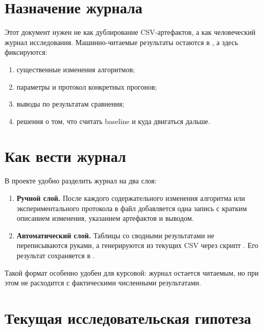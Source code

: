 \documentclass[a4paper,12pt]{article}
\begin{document}

\newpage
\setcounter{page}{2}

{
  \hypersetup{linkcolor=black}
  \tableofcontents
}

\newpage

\section{Назначение журнала}

Этот документ нужен не как дублирование CSV-артефактов, а как человеческий журнал исследования.
Машинно-читаемые результаты остаются в , а здесь фиксируются:
\begin{enumerate}[label=\arabic*.]
  \item существенные изменения алгоритмов;
  \item параметры и протокол конкретных прогонов;
  \item выводы по результатам сравнения;
  \item решения о том, что считать baseline и куда двигаться дальше.
\end{enumerate}

\section{Как вести журнал}

В проекте удобно разделить журнал на два слоя:
\begin{enumerate}[label=\arabic*.]
  \item \textbf{Ручной слой.} После каждого содержательного изменения алгоритма или экспериментального протокола в файл  добавляется одна запись с кратким описанием изменения, указанием артефактов и выводом.
  \item \textbf{Автоматический слой.} Таблицы со сводными результатами не переписываются руками, а генерируются из текущих CSV через скрипт . Его результат сохраняется в .
\end{enumerate}

Такой формат особенно удобен для курсовой: журнал остается читаемым, но при этом не расходится с фактическими численными результатами.

\section{Текущая исследовательская гипотеза}
\end{document}
